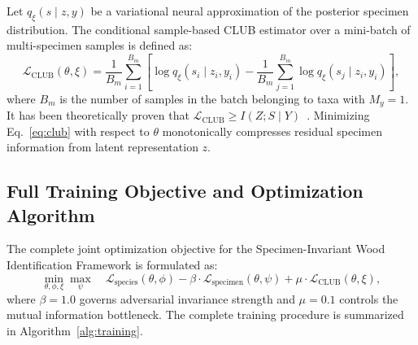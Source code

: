 \documentclass[a4paper,fleqn]{cas-sc}
\begin{document}
Let $q_\xi(s \mid z, y)$ be a variational neural approximation of the posterior specimen distribution. The conditional sample-based CLUB estimator over a mini-batch of multi-specimen samples is defined as:
\begin{equation}
    \mathcal{L}_{\text{CLUB}}(\theta, \xi) = \frac{1}{B_m} \sum_{i=1}^{B_m} \left[ \log q_\xi(s_i \mid z_i, y_i) - \frac{1}{B_m} \sum_{j=1}^{B_m} \log q_\xi(s_j \mid z_i, y_i) \right],
    \label{eq:club}
\end{equation}
where $B_m$ is the number of samples in the batch belonging to taxa with $M_y = 1$. It has been theoretically proven that $\mathcal{L}_{\text{CLUB}} \ge I(Z; S \mid Y)$~\cite{cheng2020club}. Minimizing Eq.~\eqref{eq:club} with respect to $\theta$ monotonically compresses residual specimen information from latent representation $z$.

\subsection{Full Training Objective and Optimization Algorithm}
The complete joint optimization objective for the Specimen-Invariant Wood Identification Framework is formulated as:
\begin{equation}
    \min_{\theta, \phi, \xi} \max_{\psi} \quad \mathcal{L}_{\text{species}}(\theta, \phi) - \beta \cdot \mathcal{L}_{\text{specimen}}(\theta, \psi) + \mu \cdot \mathcal{L}_{\text{CLUB}}(\theta, \xi),
    \label{eq:full_objective}
\end{equation}
where $\beta = 1.0$ governs adversarial invariance strength and $\mu = 0.1$ controls the mutual information bottleneck. The complete training procedure is summarized in Algorithm~\ref{alg:training}.
\end{document}
